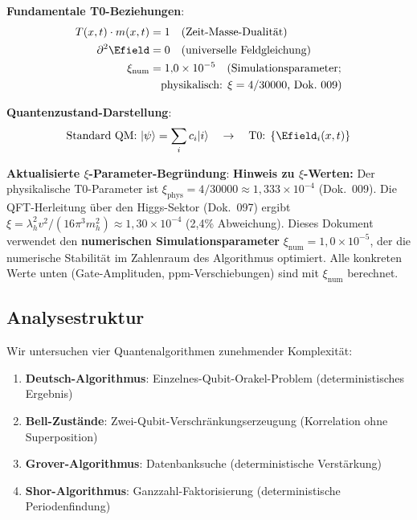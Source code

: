 	\begin{tcolorbox}[colback=blue!5!white,colframe=blue!75!black,title=Kern-T0-Prinzipien mit aktualisiertem $\xi$-Parameter]
		\textbf{Fundamentale T0-Beziehungen}:
\begin{align}
	T(x,t) \cdot m(x,t) &= 1 \quad \text{(Zeit-Masse-Dualität)} \\
	\partial^2 \Efield &= 0 \quad \text{(universelle Feldgleichung)} \\
	\xi_{\text{num}} &= 1{,}0 \times 10^{-5} \quad 
	\text{(Simulationsparameter;}\\
	& \quad \text{physikalisch: $\xi = 4/30000$, Dok.~009)}
\end{align}
		
		\textbf{Quantenzustand-Darstellung}:
		\begin{equation}
			\text{Standard QM: } |\psi\rangle = \sum_i c_i |i\rangle \quad \rightarrow \quad \text{T0: } \{\Efield_i(x,t)\}
		\end{equation}
		
		\textbf{Aktualisierte $\xi$-Parameter-Begründung}:
		\textbf{Hinweis zu $\xi$-Werten:} Der physikalische T0-Parameter ist $\xi_{\text{phys}} = 4/30000 \approx 1{,}333 \times 10^{-4}$ (Dok.~009). Die QFT-Herleitung über den Higgs-Sektor (Dok.~097) ergibt $\xi = \lambda_h^2 v^2/(16\pi^3 m_h^2) \approx 1{,}30 \times 10^{-4}$ (2{,}4\% Abweichung). Dieses Dokument verwendet den \textbf{numerischen Simulationsparameter} $\xi_{\text{num}} = 1{,}0 \times 10^{-5}$, der die numerische Stabilität im Zahlenraum des Algorithmus optimiert. Alle konkreten Werte unten (Gate-Amplituden, ppm-Verschiebungen) sind mit $\xi_{\text{num}}$ berechnet.
	\end{tcolorbox}
	
	\subsection{Analysestruktur}
	
	Wir untersuchen vier Quantenalgorithmen zunehmender Komplexität:
	
	\begin{enumerate}
		\item \textbf{Deutsch-Algorithmus}: Einzelnes-Qubit-Orakel-Problem (deterministisches Ergebnis)
		\item \textbf{Bell-Zustände}: Zwei-Qubit-Verschränkungserzeugung (Korrelation ohne Superposition)
		\item \textbf{Grover-Algorithmus}: Datenbanksuche (deterministische Verstärkung)
		\item \textbf{Shor-Algorithmus}: Ganzzahl-Faktorisierung (deterministische Periodenfindung)
	\end{enumerate}
	
